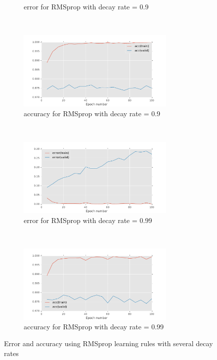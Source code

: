 \documentclass[11pt]{article}
\begin{document}
\begin{figure}[t!]
\begin{subfigure}[t]{0.45\textwidth}
        \caption{error for RMSprop with decay rate = 0.9}
    \end{subfigure}   
    ~
    \begin{subfigure}[t]{0.45\textwidth}
        \centering
        \includegraphics[height=1.5in]{acc_with_RMSprop_decay_0_9.pdf}
        \caption{accuracy for RMSprop with decay rate = 0.9}
    \end{subfigure}    
	~
    \begin{subfigure}[t]{0.45\textwidth}
        \centering
        \includegraphics[height=1.5in]{error_with_RMSprop_decay_0_99.pdf}
        \caption{error for RMSprop with decay rate = 0.99}
    \end{subfigure}   
    ~
    \begin{subfigure}[t]{0.45\textwidth}
        \centering
        \includegraphics[height=1.5in]{acc_with_RMSprop_decay_0_99.pdf}
        \caption{accuracy for RMSprop with decay rate = 0.99}
    \end{subfigure}       
    \caption{Error and accuracy using RMSprop learning rules with several decay rates}    
    \label{fig:rms_decay}
\end{figure}
\end{document}
